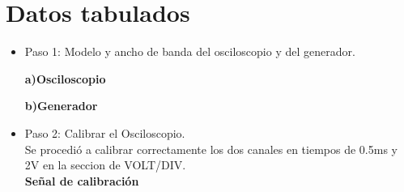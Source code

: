 \documentclass[twoside,twocolumn]{article}
\begin{document}
\section{Datos tabulados}
\begin{itemize}
\item Paso 1: Modelo y ancho de banda del osciloscopio y del generador.
\newline

\textbf{a)Osciloscopio}
\begin{table}[h]
\centering
{}
\end{table}

    \textbf{b)Generador}
    \begin{table}[h]
    \centering
    \end{table}

    
  \item Paso 2: Calibrar el Osciloscopio.\\

    Se procedió a calibrar correctamente los dos canales en tiempos de 0.5ms y 2V en la seccion de VOLT/DIV.\\
    
    \textbf{Señal de calibración}
    \begin{table}[h]
    \centering
    \end{table}
    

\end{itemize}
\end{document}
